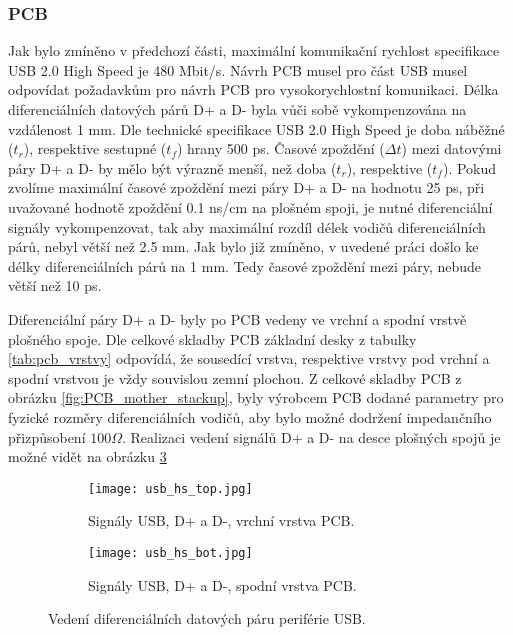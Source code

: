 	\subsubsection{PCB}
	Jak bylo zmíněno v předchozí části, maximální komunikační rychlost specifikace USB 2.0 High Speed je 480 Mbit/s. Návrh PCB musel pro část USB musel odpovídat požadavkům pro návrh PCB pro vysokorychlostní komunikaci. Délka diferenciálních datových párů D+ a D- byla vůči sobě vykompenzována na vzdálenost 1 mm. Dle technické specifikace USB 2.0 High Speed je doba náběžné ($t_r$), respektive sestupné ($t_f$) hrany 500 ps. Časové zpoždění ($\Delta t$) mezi datovými páry D+ a D- by mělo být výrazně menší, než doba ($t_r$), respektive ($t_f$). Pokud zvolíme maximální časové zpoždění mezi páry D+ a D- na hodnotu 25 ps, při uvažované hodnotě zpoždění 0.1 ns/cm na plošném spoji, je nutné diferenciální signály vykompenzovat, tak aby maximální rozdíl délek vodičů diferenciálních párů, nebyl větší než 2.5 mm. Jak bylo již zmíněno, v uvedené práci došlo ke délky diferenciálních párů na 1 mm. Tedy časové zpoždění mezi páry, nebude větší než 10 ps.
	\par Diferenciální páry D+ a D- byly po PCB vedeny ve vrchní a spodní vrstvě plošného spoje. Dle celkové skladby PCB základní desky z tabulky \ref{tab:pcb_vrstvy} odpovídá, že sousedící vrstva, respektive vrstvy pod vrchní a spodní vrstvou je vždy souvislou zemní plochou. Z celkové skladby PCB z obrázku \ref{fig:PCB_mother_stackup}, byly výrobcem PCB dodané parametry pro fyzické rozměry diferenciálních vodičů, aby bylo možné dodržení impedančního přizpůsobení $100 \Omega$. Realizaci vedení signálů D+ a D- na desce plošných spojů je možné vidět na obrázku \ref{fig:usb_layout}
	
	\begin{figure}[h!]
		\begin{subfigure}{0.5\textwidth}
			\centering
			\captionsetup{justification=centering}
			\texttt{[image: usb\_hs\_top.jpg]}
			\caption{Signály USB, D+ a D-, vrchní vrstva PCB.} 
			\label{fig:usb_top}
		\end{subfigure} \hfill
		\begin{subfigure}{0.5\textwidth}
			\centering
			\captionsetup{justification=centering}
			\texttt{[image: usb\_hs\_bot.jpg]}
			\caption{Signály USB, D+ a D-, spodní vrstva PCB.} 
			\label{fig:usb_bot}
		\end{subfigure}
		\caption{Vedení diferenciálních datových páru periférie USB.}
		\label{fig:usb_layout}
	\end{figure} 


